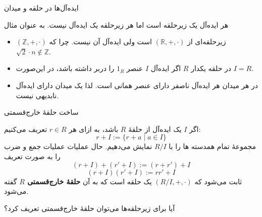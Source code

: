 \begin{frame}[t]{ایده‌آل‌ها در حلقه و میدان}
    \begin{example}
        هر ایده‌آل یک زیرحلقه است اما هر زیرحلقه یک ایده‌آل نیست. به عنوان مثال
        \begin{itemize}
            \item  $(\mathbb{Z}, +, \cdot)$ زیرحلقه‌ای از $(\mathbb{R}, +, \cdot)$ است ولی ایده‌آل آن نیست. چرا که \( \sqrt{2} \cdot  n \not \in \mathbb{Z}\).
        \end{itemize}
    \end{example}

    \begin{remark}
        \begin{itemize}
            \item در حلقه یکدار
                  $R$
                  اگر ایده‌آل
                  \(I\)
                  عنصر
                  \(1_R\)
                  را دربر داشته باشد، در این‌صورت
                  \(I = R\).
            \item در هر میدان هر ایده‌آل ناصفر دارای عنصر همانی است. لذا یک میدان دارای ایده‌آل نابدیهی نیست.
        \end{itemize}

    \end{remark}

\end{frame}

\begin{frame}[t]{ساخت حلقهٔ خارج‌قسمتی}
    \begin{definition}
        اگر $I$ یک ایده‌آل از حلقهٔ $R$ باشد، به ازای هر \(r \in R\) تعریف می‌کنیم:
        \[
            r + I := \{ r + a \mid a \in I \}
        \]
        مجموعهٔ تمام همدسته ها را با \(R/I\) نمایش می‌دهیم. حال عملیات عملیات جمع و ضرب  را به صورت تعریف
        \[
            (r + I) + (r' + I) := (r + r') + I
        \]
        \[
            (r + I)(r' + I) := rr' + I
        \]
        ثابت می‌شود که $(R/I, +, \cdot)$ یک حلقه است که به آن \textbf{حلقهٔ خارج‌قسمتی $R$}   گفته می‌شود.

    \end{definition}


    \begin{remark}
        آیا برای زیرحلقه‌ها می‌توان حلقهٔ خارج‌قسمتی تعریف کرد؟
    \end{remark}

\end{frame}



